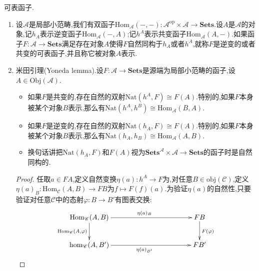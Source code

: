 可表函子.
\begin{enumerate}
	\item 设$\mathscr{A}$是局部小范畴,我们有双函子$\mathrm{Hom}_{\mathscr{A}}(-,-):\mathscr{A}^{\mathrm{op}}\times\mathscr{A}\to\textbf{Sets}$.设$A$是$\mathscr{A}$的对象,记$h_A$表示逆变函子$\mathrm{Hom}_{\mathscr{A}}(-,A)$;记$h^A$表示共变函子$\mathrm{Hom}_{\mathscr{A}}(A,-)$.如果函子$F:\mathscr{A}\to\textbf{Sets}$满足存在对象$A$使得$F$自然同构于$h_A$或者$h^A$,就称$F$是逆变的或者共变的可表函子,并且称它被对象$A$表示.
	\item 米田引理(Yoneda lemma).设$F:\mathscr{A}\to\textbf{Sets}$是源端为局部小范畴的函子,设$A\in\mathrm{Obj}(\mathscr{A})$.
	\begin{itemize}
		\item 如果$F$是共变的,存在自然的双射$\mathrm{Nat}(h^A,F)\cong F(A)$.特别的,如果$F$本身被某个对象$B$表示,那么有$\mathrm{Nat}(h^A,h^B)\cong\mathrm{Hom}_{\mathscr{A}}(B,A)$.
		\item 如果$F$是逆变的,存在自然的双射$\mathrm{Nat}(h_A,F)\cong F(A)$.特别的,如果$F$本身被某个对象$B$表示,那么有$\mathrm{Nat}(h_A,h_B)\cong\mathrm{Hom}_{\mathscr{A}}(A,B)$.
		\item 换句话讲把$\mathrm{Nat}(h_{A},F)$和$F(A)$视为$\textbf{Sets}^{\mathscr{A}}\times\mathscr{A}\to\textbf{Sets}$的函子时是自然同构的.
	\end{itemize}
	\begin{proof} 
		
		任取$a\in FA$,定义自然变换$\eta(a):h^A\to F$为,对任意$B\in\mathrm{obj}(\mathscr{C})$,定义$\eta(a)_B:\mathrm{Hom}_{\mathscr{C}}(A,B)\to FB$为$f\mapsto F(f)(a)$.为验证$\eta(a)$的自然性,只要验证对任意$\mathscr{C}$中的态射$\varphi:B\to B'$有图表交换:
		$$\xymatrix{\mathrm{Hom}_{\mathscr{C}}(A,B)\ar[rrrr]^{\eta(a)_B}\ar[d]_{\mathrm{Hom}_{\mathscr{C}}(A,\varphi)}&&&&FB\ar[d]^{F(\varphi)}\\\mathrm{hom}_{\mathscr{C}}(A,B')\ar[rrrr]_{\eta(a)_{B'}}&&&&FB'}$$
		

\end{proof}
\end{enumerate}
